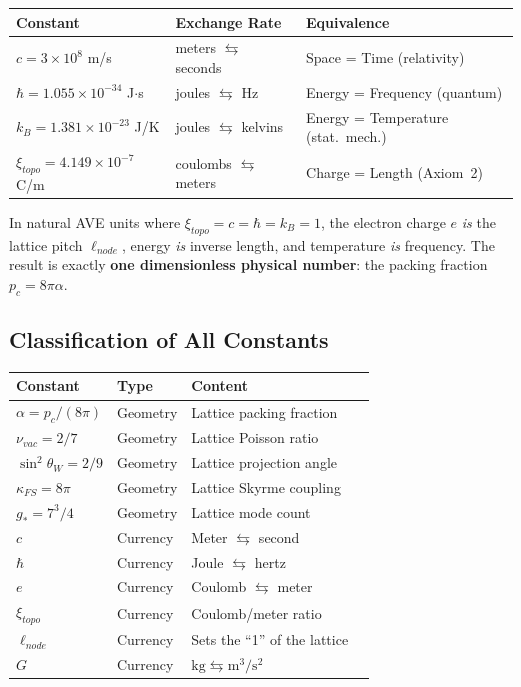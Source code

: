 \begin{center}
\small
\begin{tabular}{lll}
\toprule
\textbf{Constant} & \textbf{Exchange Rate} & \textbf{Equivalence} \\
\midrule
$c = 3 \times 10^8$ m/s & meters $\leftrightarrows$ seconds
    & Space = Time (relativity) \\
$\hbar = 1.055 \times 10^{-34}$ J$\cdot$s & joules $\leftrightarrows$ Hz
    & Energy = Frequency (quantum) \\
$k_B = 1.381 \times 10^{-23}$ J/K & joules $\leftrightarrows$ kelvins
    & Energy = Temperature (stat.~mech.) \\
$\xi_{topo} = 4.149 \times 10^{-7}$ C/m & coulombs $\leftrightarrows$ meters
    & Charge = Length (Axiom~2) \\
\bottomrule
\end{tabular}
\end{center}

In natural AVE units where $\xi_{topo} = c = \hbar = k_B = 1$,
the electron charge $e$ \textit{is} the lattice pitch $\ell_{node}$,
energy \textit{is} inverse length, and temperature \textit{is}
frequency.  The result is exactly \textbf{one dimensionless
physical number}: the packing fraction $p_c = 8\pi\alpha$.

\subsection{Classification of All Constants}

\begin{center}
\small
\begin{tabular}{llll}
\toprule
\textbf{Constant} & \textbf{Type} & \textbf{Content} \\
\midrule
$\alpha = p_c/(8\pi)$ & Geometry & Lattice packing fraction \\
$\nu_{vac} = 2/7$ & Geometry & Lattice Poisson ratio \\
$\sin^2\theta_W = 2/9$ & Geometry & Lattice projection angle \\
$\kappa_{FS} = 8\pi$ & Geometry & Lattice Skyrme coupling \\
$g_* = 7^3/4$ & Geometry & Lattice mode count \\
\midrule
$c$ & Currency & Meter $\leftrightarrows$ second \\
$\hbar$ & Currency & Joule $\leftrightarrows$ hertz \\
$e$ & Currency & Coulomb $\leftrightarrows$ meter \\
$\xi_{topo}$ & Currency & Coulomb/meter ratio \\
$\ell_{node}$ & Currency & Sets the ``1'' of the lattice \\
$G$ & Currency & $\text{kg} \leftrightarrows \text{m}^3/\text{s}^2$ \\
\bottomrule
\end{tabular}
\end{center}

